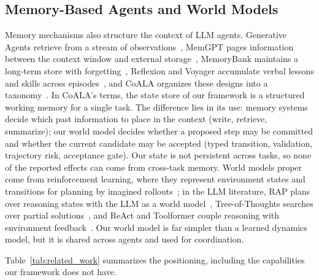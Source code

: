 \subsection{Memory-Based Agents and World Models}
Memory mechanisms also structure the context of LLM agents.
Generative Agents retrieve from a stream of observations~\cite{park2023generative}, MemGPT pages information between the context window and external storage~\cite{packer2023memgpt}, MemoryBank maintains a long-term store with forgetting~\cite{zhong2024memorybank}, Reflexion and Voyager accumulate verbal lessons and skills across episodes~\cite{shinn2023reflexion,wang2024voyager}, and CoALA organizes these designs into a taxonomy~\cite{sumers2024coala}.
In CoALA's terms, the state store of our framework is a structured working memory for a single task.
The difference lies in its use: memory systems decide which past information to place in the context (write, retrieve, summarize); our world model decides whether a proposed step may be committed and whether the current candidate may be accepted (typed transition, validation, trajectory risk, acceptance gate).
Our state is not persistent across tasks, so none of the reported effects can come from cross-task memory.
World models proper come from reinforcement learning, where they represent environment states and transitions for planning by imagined rollouts~\cite{ha2018recurrent,hafner2020dream}; in the LLM literature, RAP plans over reasoning states with the LLM as a world model~\cite{hao2023rap}, Tree-of-Thoughts searches over partial solutions~\cite{yao2023tree}, and ReAct and Toolformer couple reasoning with environment feedback~\cite{yao2023react,schick2023toolformer}.
Our world model is far simpler than a learned dynamics model, but it is shared across agents and used for coordination.

Table~\ref{tab:related_work} summarizes the positioning, including the capabilities our framework does not have.

